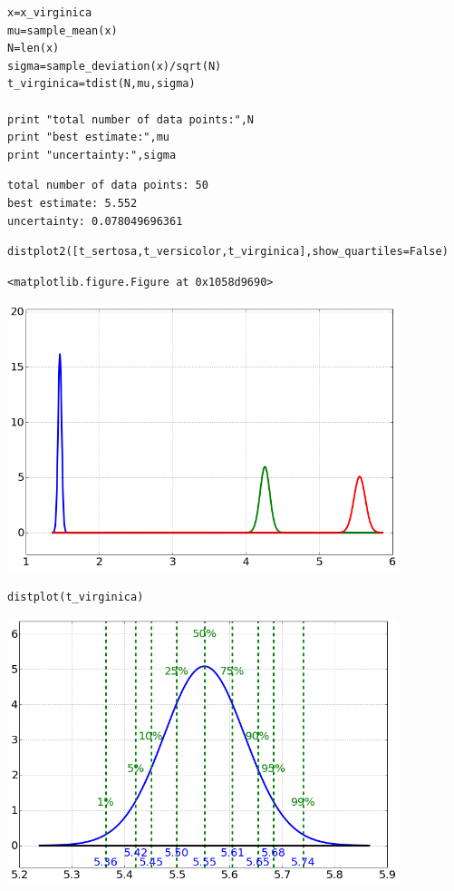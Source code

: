 \begin{lstlisting}
x=x_virginica
mu=sample_mean(x)
N=len(x)
sigma=sample_deviation(x)/sqrt(N)
t_virginica=tdist(N,mu,sigma)

print "total number of data points:",N
print "best estimate:",mu
print "uncertainty:",sigma
\end{lstlisting}

\begin{verbatim}
total number of data points: 50
best estimate: 5.552
uncertainty: 0.078049696361
\end{verbatim}

\begin{lstlisting}
distplot2([t_sertosa,t_versicolor,t_virginica],show_quartiles=False)
\end{lstlisting}

\begin{verbatim}
<matplotlib.figure.Figure at 0x1058d9690>\end{verbatim}

\begin{center}\includegraphics[width=4.5in]{Applications_of_Parameter_Estimation/Applications_of_Parameter_Estimation_fig0.png}\end{center}

\begin{lstlisting}
distplot(t_virginica)
\end{lstlisting}

\begin{center}\includegraphics[width=4.5in]{Applications_of_Parameter_Estimation/Applications_of_Parameter_Estimation_fig1.png}\end{center}

